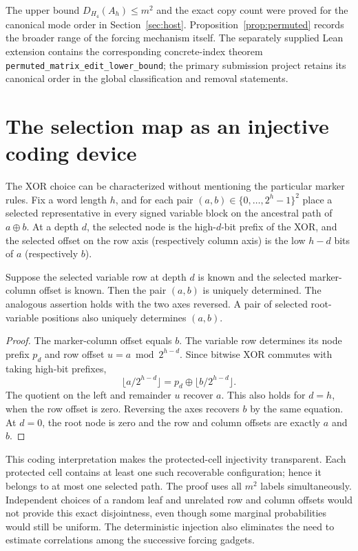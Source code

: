 The upper bound $D_{H_4}(A_h)\le m^2$ and the exact copy count were
proved for the canonical mode order in Section~\ref{sec:host}.
Proposition~\ref{prop:permuted} records the broader range of the
forcing mechanism itself. The separately supplied Lean extension
contains the corresponding concrete-index theorem
\texttt{permuted\_matrix\_edit\_lower\_bound}; the primary
submission project retains its canonical order in the global
classification and removal statements.

\section{The selection map as an injective coding device}
\label{sec:selectionmap}
The XOR choice can be characterized without mentioning the particular
marker rules. Fix a word length $h$, and for each pair
$(a,b)\in\{0,\dots,2^h-1\}^2$ place a selected representative in
every signed variable block on the ancestral path of $a\oplus b$.
At a depth $d$, the selected node is the high-$d$-bit prefix of the
XOR, and the selected offset on the row axis (respectively column
axis) is the low $h-d$ bits of $a$ (respectively $b$).

\begin{lemma}\label{lem:recovery}
Suppose the selected variable row at depth $d$ is known and the
selected marker-column offset is known. Then the pair $(a,b)$ is
uniquely determined. The analogous assertion holds with the two
axes reversed. A pair of selected root-variable positions also
uniquely determines $(a,b)$.
\end{lemma}
\begin{proof}
The marker-column offset equals $b$. The variable row determines
its node prefix $p_d$ and row offset $u=a\bmod2^{h-d}$. Since
bitwise XOR commutes with taking high-bit prefixes,
\[
 \lfloor a/2^{h-d}\rfloor
     =p_d\oplus\lfloor b/2^{h-d}\rfloor.
\]
The quotient on the left and remainder $u$ recover $a$. This
also holds for $d=h$, when the row offset is zero. Reversing the
axes recovers $b$ by the same equation. At $d=0$, the root node
is zero and the row and column offsets are exactly $a$ and $b$.
\end{proof}

This coding interpretation makes the protected-cell injectivity
transparent. Each protected cell contains at least one such
recoverable configuration; hence it belongs to at most one selected
path. The proof uses all $m^2$ labels simultaneously. Independent
choices of a random leaf and unrelated row and column offsets would
not provide this exact disjointness, even though some marginal
probabilities would still be uniform. The deterministic injection
also eliminates the need to estimate correlations among the
successive forcing gadgets.
